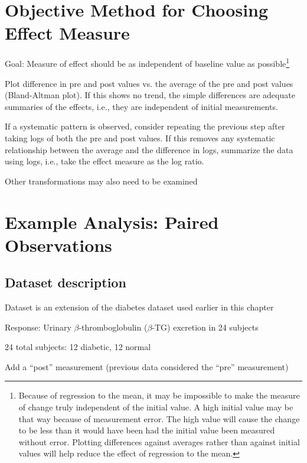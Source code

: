 \section{Objective Method for Choosing Effect Measure}
\bi
\item   Goal: Measure of effect should be as independent of
        baseline value as possible\footnote{Because of regression to
        the mean, it may be impossible to make the measure of change
        truly independent of the initial value.  A high initial value
        may be that way because of measurement error.  The high value will
        cause the change to be less than it would have been had the
        initial value been measured without error.  Plotting
        differences against averages rather than against initial
        values will help reduce the effect of regression to the mean.}
\item   Plot difference in pre and post values vs. the average of the
        pre and post values (Bland-Altman plot).  If this shows no trend, the simple
        differences are adequate summaries of the effects, i.e., they
        are independent of initial measurements.
\item   If a systematic pattern is observed, consider repeating the
        previous step after taking logs of both the pre and post
        values.  If this removes any systematic relationship between
        the average and the difference in logs, summarize the data
        using logs, i.e., take the effect measure as the log ratio.
\item   Other transformations may also need to be examined
\ei


\section{Example Analysis: Paired Observations}

\subsection{Dataset description}
\bi
  \item Dataset is an extension of the diabetes dataset used earlier in this chapter
  \item Response: Urinary $\beta$-thromboglobulin ($\beta$-TG) excretion in 24 subjects
  \item 24 total subjects: 12 diabetic, 12 normal
  \item Add a ``post'' measurement (previous data considered the ``pre'' measurement)
\ei

